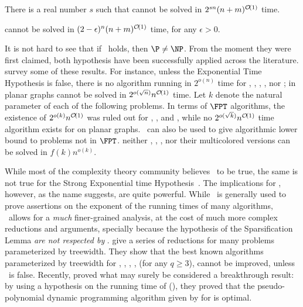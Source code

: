 \begin{class_definition*}
    There is a real number $s$ such that  cannot be solved in $2^{sn}(n + m)^{\mathcal{O}\!\left(1\right)}$ time.
\end{class_definition*}


\begin{class_definition*}
     cannot be solved in $(2 - \epsilon)^{n}(n + m)^{\mathcal{O}\!\left(1\right)}$ time, for any $\epsilon > 0$.
\end{class_definition*}


It is not hard to see that if \ETH\ holds, then $\P \neq \NP$.
From the moment they were first claimed, both hypothesis have been successfully applied across the literature.
\cite{eth_survey} survey some of these results.
For instance, unless the Exponential Time Hypothesis is false, there is no algorithm running in $2^{o(n)}$ time for , , , , nor ;
 in planar graphs cannot be solved in $2^{o(\sqrt{n})}n^{\mathcal{O}\!\left(1\right)}$ time.
Let $k$ denote the natural parameter of each of the following problems.
In terms of $\FPT$ algorithms, the existence of $2^{o(k)}n^{\mathcal{O}\!\left(1\right)}$ was ruled out for , , and , while no $2^{o(\sqrt{k})}n^{\mathcal{O}\!\left(1\right)}$ time algorithm exists for  on planar graphs.
\ETH\ can also be used to give algorithmic lower bound to problems not in $\FPT$.
\cite{eth_survey} neither , , , nor their multicolored versions can be solved in $f(k)n^{o(k)}$.

While most of the complexity theory community believes \ETH\ to be true, the same is not true for the Strong Exponential time Hypothesis~\citep{bad_seth}.
The implications for \SETH, however, as the name suggests, are quite powerful.
While \ETH\ is generally used to prove assertions on the exponent of the running times of many algorithms, \SETH\ allows for a \textit{much} finer-grained analysis, at the cost of much more complex reductions and arguments, specially because the hypothesis of the Sparsification Lemma \textit{are not respected by }.
\cite{seth_lokshtanov} give a series of reductions for many problems parameterized by treewidth.
They show that the best known algorithms parameterized by treewidth for , , , ,  (for any $q \geq 3$),  cannot be improved, unless \SETH\ is false.
Recently, \cite{seth_subset_sum} proved what may surely be considered a breakthrough result: by using a hypothesis on the running time of  (\SETH), they proved that the pseudo-polynomial dynamic programming algorithm given by \cite{bellman_dp} for  is optimal.


